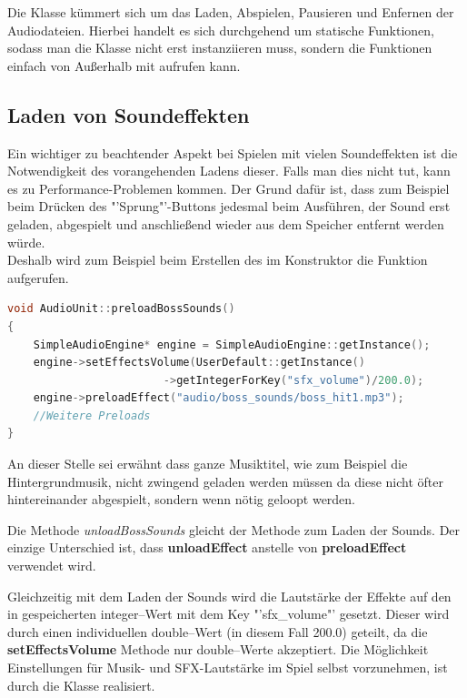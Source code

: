 \label{sec:4_Audiounit}
Die Klasse  kümmert sich um das Laden, Abspielen, Pausieren und Enfernen der Audiodateien. Hierbei handelt es sich durchgehend um statische Funktionen, sodass man die Klasse nicht erst instanziieren muss, sondern die Funktionen einfach von Außerhalb mit  aufrufen kann.

\subsection{Laden von Soundeffekten}
Ein wichtiger zu beachtender Aspekt bei Spielen mit vielen Soundeffekten ist die Notwendigkeit des vorangehenden Ladens dieser. Falls man dies nicht tut, kann es zu Performance-Problemen kommen. Der Grund dafür ist, dass zum Beispiel beim Drücken des "'Sprung"'-Buttons jedesmal beim Ausführen, der Sound erst geladen, abgespielt und anschließend wieder aus dem Speicher entfernt werden würde. \\Deshalb wird zum Beispiel beim Erstellen des  im Konstruktor die Funktion  aufgerufen.

\begin{lstlisting}[label=lst:preloadBossSounds,
				   language=C++,
				   firstnumber=30,
				   caption=BossLevel-Sounds laden ( AudioUnit.cpp )]
void AudioUnit::preloadBossSounds()
{
	SimpleAudioEngine* engine = SimpleAudioEngine::getInstance();
	engine->setEffectsVolume(UserDefault::getInstance()
						->getIntegerForKey("sfx_volume")/200.0);
	engine->preloadEffect("audio/boss_sounds/boss_hit1.mp3");
	//Weitere Preloads
}
\end{lstlisting}

An dieser Stelle sei erwähnt dass ganze Musiktitel, wie zum Beispiel die Hintergrundmusik, nicht zwingend geladen werden müssen da diese nicht öfter hintereinander abgespielt, sondern wenn nötig geloopt werden. 

Die Methode \textit{unloadBossSounds} gleicht der Methode zum Laden der Sounds. Der einzige Unterschied ist, dass \textbf{unloadEffect} anstelle von \textbf{preloadEffect} verwendet wird.

Gleichzeitig mit dem Laden der Sounds wird die Lautstärke der Effekte auf den in  gespeicherten integer--Wert mit dem Key "'sfx\_volume"' gesetzt. Dieser wird durch einen individuellen double--Wert (in diesem Fall 200.0) geteilt, da die \textbf{setEffectsVolume} Methode nur double--Werte akzeptiert. Die Möglichkeit Einstellungen für Musik- und SFX-Lautstärke im Spiel selbst vorzunehmen, ist durch die Klasse  realisiert. 

